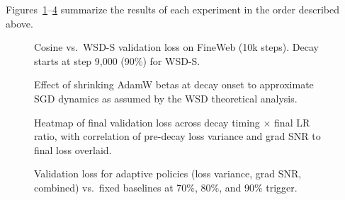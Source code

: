 \documentclass[10pt,conference,compsocconf]{IEEEtran}
\begin{document}
Figures~\ref{fig:exp1}--\ref{fig:exp4} summarize the results of each
experiment in the order described above.

\begin{figure}[tbp]
  \centering
  \caption{Cosine vs.\ WSD-S validation loss on FineWeb (10k steps).
    Decay starts at step 9,000 (90\%) for WSD-S.}
  \label{fig:exp1}
\end{figure}

\begin{figure}[tbp]
  \centering
  \caption{Effect of shrinking AdamW betas at decay onset to approximate
    SGD dynamics as assumed by the WSD theoretical analysis.}
  \label{fig:exp2}
\end{figure}

\begin{figure}[tbp]
  \centering
  \caption{Heatmap of final validation loss across decay timing $\times$
    final LR ratio, with correlation of pre-decay loss variance and grad
    SNR to final loss overlaid.}
  \label{fig:exp3}
\end{figure}

\begin{figure}[tbp]
  \centering
  \caption{Validation loss for adaptive policies (loss variance, grad SNR,
    combined) vs.\ fixed baselines at 70\%, 80\%, and 90\% trigger.}
  \label{fig:exp4}
\end{figure}
\end{document}
